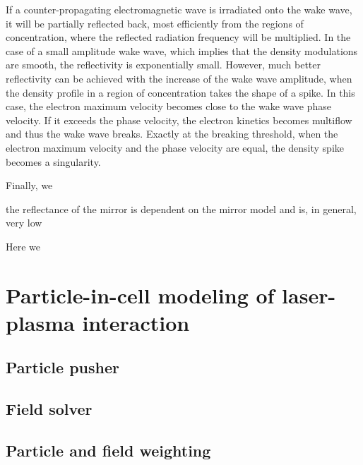 \documentclass[10pt, a4paper, twoside, openright]{report}
\begin{document}
If a counter-propagating electromagnetic wave is irradiated onto the wake wave, it will be partially reflected back, most efficiently from the regions of concentration, where the reflected radiation frequency will be multiplied. In the case of a small amplitude wake wave, which implies that the density modulations are smooth, the reflectivity is exponentially small. However, much better reflectivity can be achieved with the increase of the wake wave amplitude, when the density profile in a region of concentration takes the shape of a spike. In this case, the electron maximum velocity becomes close to the wake wave phase velocity. If it exceeds the phase velocity, the electron kinetics becomes multiflow and thus the wake wave breaks. Exactly at the breaking threshold, when the electron maximum velocity and the phase velocity are equal, the density spike becomes a singularity.

Finally, we 

the reflectance of the mirror is dependent on the mirror model and is, in general, very low

Here we 






\section{Particle-in-cell modeling of laser-plasma interaction}
%

\subsection{Particle pusher}

\subsection{Field solver}

\subsection{Particle and field weighting}

%
\end{document}
